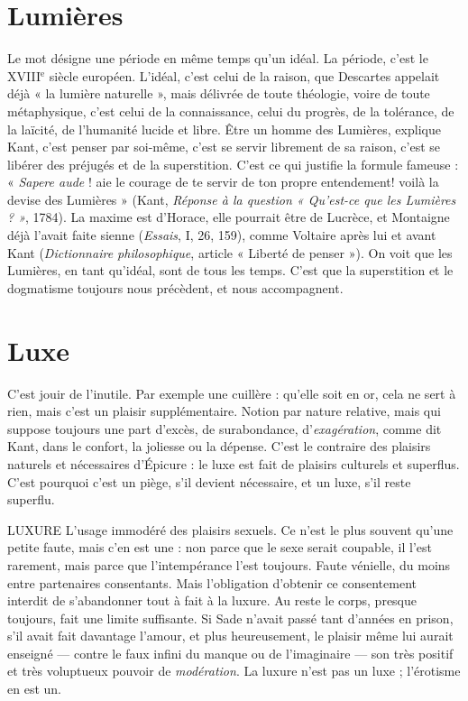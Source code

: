 {\section{Lumières}
Le mot désigne une période en même temps qu’un idéal. La
période, c’est le {\footnotesize XVIII$^\text{e}$} siècle européen. L'idéal, c’est celui de la
raison, que Descartes appelait déjà « la lumière naturelle », mais délivrée de
toute théologie, voire de toute métaphysique, c’est celui de la connaissance,
celui du progrès, de la tolérance, de la laïcité, de l’humanité lucide et libre. Être
un homme des Lumières, explique Kant, c’est penser par soi-même, c’est se
servir librement de sa raison, c’est se libérer des préjugés et de la superstition.
C'est ce qui justifie la formule fameuse : « {\it Sapere aude} ! aie le courage de te
servir de ton propre entendement! voilà la devise des Lumières » (Kant,
{\it Réponse à la question « Qu'est-ce que les Lumières ? »}, 1784). La maxime est
d’Horace, elle pourrait être de Lucrèce, et Montaigne déjà l’avait faite sienne
({\it Essais}, I, 26, 159), comme Voltaire après lui et avant Kant ({\it Dictionnaire philosophique},
article « Liberté de penser »). On voit que les Lumières, en tant
qu’idéal, sont de tous les temps. C’est que la superstition et le dogmatisme toujours
nous précèdent, et nous accompagnent.

\section{Luxe}
C'est jouir de l’inutile. Par exemple une cuillère : qu’elle soit en or,
cela ne sert à rien, mais c’est un plaisir supplémentaire. Notion par
nature relative, mais qui suppose toujours une part d’excès, de surabondance,
d’{\it exagération}, comme dit Kant, dans le confort, la joliesse ou la dépense. C’est
le contraire des plaisirs naturels et nécessaires d’Épicure : le luxe est fait de plaisirs
culturels et superflus. C’est pourquoi c’est un piège, s’il devient nécessaire,
et un luxe, s’il reste superflu.

LUXURE L'usage immodéré des plaisirs sexuels. Ce n’est le plus souvent
qu’une petite faute, mais c’en est une : non parce que le sexe serait
coupable, il l’est rarement, mais parce que l’intempérance l’est toujours. Faute
vénielle, du moins entre partenaires consentants. Mais l’obligation d’obtenir ce
consentement interdit de s’abandonner tout à fait à la luxure. Au reste le corps,
presque toujours, fait une limite suffisante. Si Sade n’avait passé tant d’années
en prison, s’il avait fait davantage l'amour, et plus heureusement, le plaisir
même lui aurait enseigné — contre le faux infini du manque ou de l’imaginaire
— son très positif et très voluptueux pouvoir de {\it modération}. La luxure n’est pas
un luxe ; l'érotisme en est un.

}
